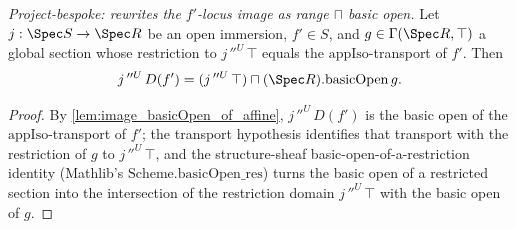 \begin{lemma}
  \label{lem:image_basicOpen_eq_inf}
  \textit{Project-bespoke: rewrites the $f'$-locus image as range $\sqcap$ basic open.}
  Let \(j : \Spec S \to \Spec R\) be an open immersion, \(f' \in S\), and \(g \in \Gamma(\Spec R, \top)\)
  a global section whose restriction to \(j\,''^{U}\,\top\) equals the \(\mathrm{appIso}\)-transport of
  \(f'\). Then
  \[
    j\,''^{U}\,D(f') = (j\,''^{U}\,\top) \sqcap (\Spec R).\mathrm{basicOpen}\,g .
  \]
\end{lemma}
\begin{proof}
  By \cref{lem:image_basicOpen_of_affine}, \(j\,''^{U}\,D(f')\) is the basic open of the
  \(\mathrm{appIso}\)-transport of \(f'\); the transport hypothesis identifies that transport with the
  restriction of \(g\) to \(j\,''^{U}\,\top\), and the structure-sheaf basic-open-of-a-restriction
  identity (Mathlib's \(\mathrm{Scheme.basicOpen\_res}\)) turns the basic open of a restricted section
  into the intersection of the restriction domain \(j\,''^{U}\,\top\) with the basic open of \(g\).
\end{proof}

